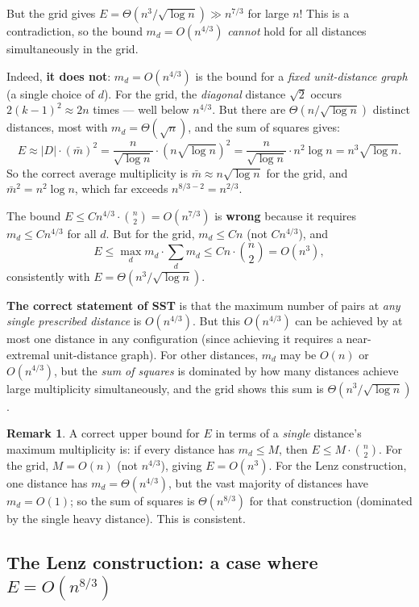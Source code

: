 \documentclass[12pt,a4paper]{amsart}
\theoremstyle{plain}
\theoremstyle{definition}
\newtheorem{remark}[theorem]{Remark}
\begin{document}
But the grid gives $E=\Theta(n^3/\sqrt{\log n})\gg n^{7/3}$ for large $n$!
This is a contradiction, so the bound $m_d=O(n^{4/3})$ \emph{cannot}
hold for all distances simultaneously in the grid.

Indeed, \textbf{it does not}: $m_d=O(n^{4/3})$ is the bound for a
\emph{fixed unit-distance graph} (a single choice of $d$).  For the
grid, the \emph{diagonal} distance $\sqrt{2}$ occurs
$2(k-1)^2\approx 2n$ times --- well below $n^{4/3}$.
But there are $\Theta(n/\sqrt{\log n})$ distinct distances,
most with $m_d=\Theta(\sqrt{n})$, and the sum of squares gives:
\[
  E \approx |D|\cdot(\bar{m})^2 = \frac{n}{\sqrt{\log n}}\cdot(n\sqrt{\log n})^2
  = \frac{n}{\sqrt{\log n}}\cdot n^2\log n = n^3\sqrt{\log n}.
\]
So the correct average multiplicity is $\bar{m}\approx n\sqrt{\log n}$
for the grid, and $\bar{m}^2=n^2\log n$, which far exceeds $n^{8/3-2}=n^{2/3}$.

The bound $E\le Cn^{4/3}\cdot\binom{n}{2}=O(n^{7/3})$ is \textbf{wrong}
because it requires $m_d\le Cn^{4/3}$ for all $d$.
But for the grid, $m_d\le Cn$ (not $Cn^{4/3}$), and
\[
  E \le \max_d m_d \cdot\sum_d m_d \le Cn\cdot\binom{n}{2} = O(n^3),
\]
consistently with $E=\Theta(n^3/\sqrt{\log n})$.

\textbf{The correct statement of SST} is that the
maximum number of pairs at \emph{any single prescribed distance} is $O(n^{4/3})$.
But this $O(n^{4/3})$ can be achieved by at most one distance in any
configuration (since achieving it requires a near-extremal unit-distance graph).
For other distances, $m_d$ may be $O(n)$ or $O(n^{4/3})$, but the
\emph{sum of squares} is dominated by how many distances achieve large
multiplicity simultaneously, and the grid shows this sum is $\Theta(n^3/\sqrt{\log n})$.

\begin{remark}
A correct upper bound for $E$ in terms of a \emph{single} distance's maximum
multiplicity is: if every distance has $m_d\le M$, then $E\le M\cdot\binom{n}{2}$.
For the grid, $M=O(n)$ (not $n^{4/3}$), giving $E=O(n^3)$.
For the Lenz construction, one distance has $m_d=\Theta(n^{4/3})$,
but the vast majority of distances have $m_d=O(1)$; so the sum of squares
is $\Theta(n^{8/3})$ for that construction (dominated by the single heavy distance).
This is consistent.
\end{remark}

\subsection{The Lenz construction: a case where $E=O(n^{8/3})$}
\end{document}
